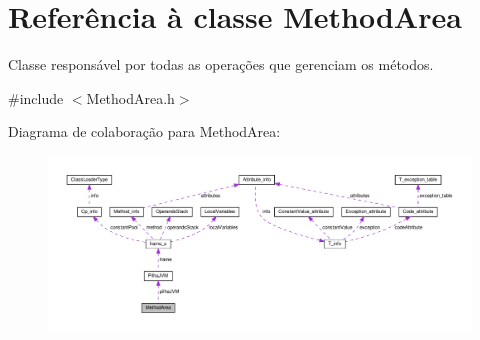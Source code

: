 \hypertarget{classMethodArea}{}\section{Referência à classe Method\+Area}
\label{classMethodArea}


Classe responsável por todas as operações que gerenciam os métodos.  




{\ttfamily \#include $<$Method\+Area.\+h$>$}



Diagrama de colaboração para Method\+Area\+:\nopagebreak
\begin{figure}[H]
\begin{center}
\leavevmode
\includegraphics[width=350pt]{classMethodArea__coll__graph}
\end{center}
\end{figure}

